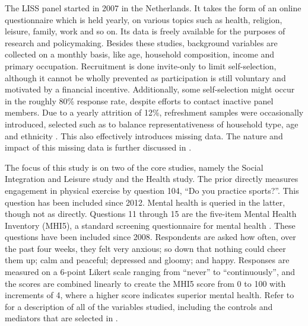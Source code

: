 The LISS panel \cite{scherpenzeel2010liss} started in 2007 in the Netherlands. It takes the form of an online questionnaire
which is held yearly, on various topics such as health, religion, leisure, family, work and so on.
Its data is freely available for the purposes of research and policymaking.
Besides these studies, background variables are collected on a monthly basis, like age, household composition,
income and primary occupation.
Recruitment is done invite-only to limit self-selection, although it cannot be wholly prevented as
participation is still voluntary and motivated by a financial incentive. Additionally, some self-selection might occur
in the roughly 80\% response rate, despite efforts to contact inactive panel members. Due to a yearly attrition of 12\%,
refreshment samples were occasionally introduced, selected such as to balance representativeness of household type,
age and ethnicity \cite{lissdata_methodology}. This also effectively introduces missing data.
The nature and impact of this missing data is further discussed in .

The focus of this study is on two of the core studies, namely the Social Integration and Leisure study and the Health study.
The prior directly measures engagement in physical exercise by question 104, ``Do you practice sports?''. This question
has been included since 2012.
Mental health is queried in the latter, though not as directly. Questions 11 through 15 are the five-item Mental Health Inventory
(MHI5), a standard screening questionnaire for mental health \cite{berwick1991performance}. These questions have been included
since 2008.
Respondents are asked how often, over the past four weeks,
they felt very anxious; so down that nothing could cheer them up; calm and peaceful; depressed and gloomy; and happy.
Responses are measured on a 6-point Likert scale ranging from ``never'' to ``continuously'', and the scores are combined
linearly to create the MHI5 score from 0 to 100 with increments of 4, where a higher score indicates superior mental health.
Refer to  for a description of all of the variables studied,
including the controls and mediators that are selected in .

